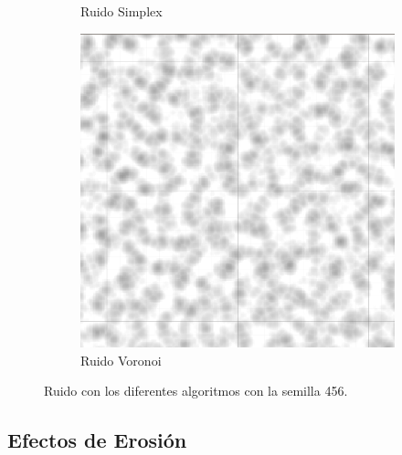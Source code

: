 \begin{itemize}
\begin{figure}[ht]
\begin{subfigure}{0.3\linewidth}
            \caption{Ruido Simplex}
        \end{subfigure}
        \hfill
        \begin{subfigure}{0.3\linewidth}
            \centering
            \includegraphics[width=\linewidth]{img/codes/Voronoi456.png}
            \caption{Ruido Voronoi}
        \end{subfigure}
        \caption{Ruido con los diferentes algoritmos con la semilla 456.}
    \end{figure}
\end{itemize}

\subsection{Efectos de Erosión}

